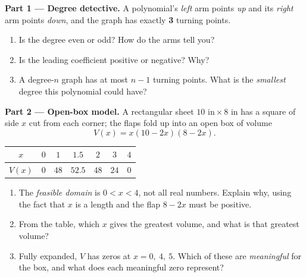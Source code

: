\documentclass[10pt]{article}
\begin{document}
\begin{tcolorbox}[colback=white, colframe=black!40, title=\textbf{Tier E --- Extension},
    fonttitle=\bfseries, arc=1.5mm, left=3mm, right=3mm, top=2mm, bottom=2mm, breakable]
\textbf{Part 1 --- Degree detective.} A polynomial's \emph{left} arm points \emph{up} and its
\emph{right} arm points \emph{down}, and the graph has exactly \textbf{3} turning points.
\begin{enumerate}[label=(\alph*), leftmargin=1.8em, itemsep=4pt]
  \item Is the degree even or odd? \blank{2.2cm} \quad How do the arms tell you? \blank{3.4cm}
  \item Is the leading coefficient positive or negative? \blank{2.6cm} Why? \blank{3.0cm}
  \item A degree-$n$ graph has at most $n-1$ turning points. What is the \emph{smallest} degree this
        polynomial could have? \blank{1.6cm}
\end{enumerate}

\vspace{4pt}
\textbf{Part 2 --- Open-box model.} A rectangular sheet $10\text{ in}\times 8\text{ in}$ has a square
of side $x$ cut from each corner; the flaps fold up into an open box of volume
\[
  V(x) = x(10-2x)(8-2x).
\]
\begin{center}
\renewcommand{\arraystretch}{1.25}
\begin{tabular}{|c|c|c|c|c|c|c|}
\hline
$x$ & $0$ & $1$ & $1.5$ & $2$ & $3$ & $4$ \\ \hline
$V(x)$ & $0$ & $48$ & $52.5$ & $48$ & $24$ & $0$ \\ \hline
\end{tabular}
\end{center}
\begin{enumerate}[label=(\alph*), leftmargin=1.8em, itemsep=6pt]
  \item The \emph{feasible domain} is $0<x<4$, not all real numbers. Explain why, using the fact that
        $x$ is a length and the flap $8-2x$ must be positive. 
  \item From the table, which $x$ gives the greatest volume, and what is that greatest volume?
        \blank{5.0cm}
  \item Fully expanded, $V$ has zeros at $x=0,\ 4,\ 5$. Which of these are \emph{meaningful} for the
        box, and what does each meaningful zero represent? 
\end{enumerate}
\end{tcolorbox}
\end{document}
